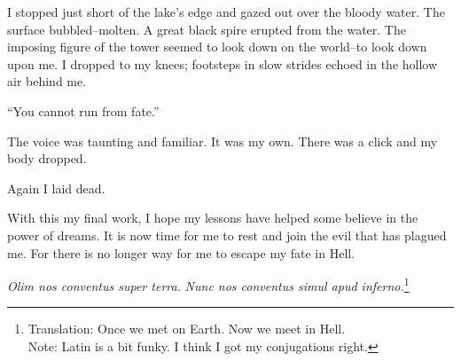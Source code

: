 \documentclass{article}
\begin{document}
I stopped just short of the lake's edge and gazed out over the bloody water.
The surface bubbled--molten.
A great black spire erupted from the water.
The imposing figure of the tower seemed to look down on the world--to
look down upon me.
I dropped to my knees;
footsteps in slow strides echoed in the hollow air behind me.
\VV


``You cannot run from fate.''
\VV


\noindent
The voice was taunting and familiar.
It was my own.
There was a click and my body dropped.


Again I laid dead.
\vvvv


\noindent
With this my final work,
I hope my lessons have helped some believe in the power of dreams.
It is now time for me to rest and join the evil that has plagued me.
For there is no longer way for me to escape my fate in Hell.
\VV

\begin{center}
\textit{Olim nos conventus super terra.}
\textit{Nunc nos conventus simul apud inferno.}\footnote{
Translation:  Once we met on Earth. Now we meet in Hell. \\
\indent
Note: Latin is a bit funky.  I think I got my conjugations right.
}
\end{center}
\end{document}
